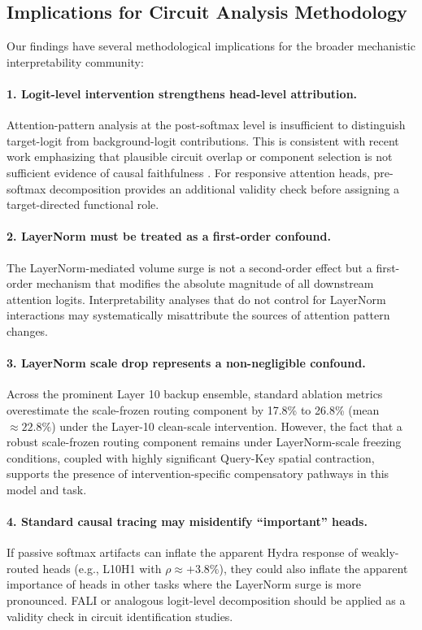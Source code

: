 \documentclass[10pt]{article} %
\begin{document}
\subsection{Implications for Circuit Analysis Methodology}

Our findings have several methodological implications for the broader
mechanistic interpretability community:

\paragraph{1. Logit-level intervention strengthens head-level attribution.}
Attention-pattern analysis at the post-softmax level is insufficient to
distinguish target-logit from background-logit contributions. This is
consistent with recent work emphasizing that plausible circuit overlap or
component selection is not sufficient evidence of causal faithfulness
\citep{hanna2024faithfulness,gupta2024interpbench}. For responsive attention
heads, pre-softmax decomposition provides an additional validity check before
assigning a target-directed functional role.

\paragraph{2. LayerNorm must be treated as a first-order confound.}
The LayerNorm-mediated volume surge is not a second-order effect but a first-order
mechanism that modifies the absolute magnitude of all downstream attention logits.
Interpretability analyses that do not control for LayerNorm interactions
may systematically misattribute the sources of attention pattern changes.

\paragraph{3. LayerNorm scale drop represents a non-negligible confound.}
Across the prominent Layer 10 backup ensemble, standard ablation metrics overestimate the scale-frozen routing component by 17.8\% to 26.8\% (mean $\approx 22.8\%$) under the Layer-10 clean-scale intervention. However, the fact that a robust scale-frozen routing component remains under LayerNorm-scale freezing conditions, coupled with highly significant Query-Key spatial contraction, supports the presence of intervention-specific compensatory pathways in this model and task.

\paragraph{4. Standard causal tracing may misidentify ``important'' heads.}
If passive softmax artifacts can inflate the apparent Hydra response of
weakly-routed heads (e.g., L10H1 with $\rho \approx +3.8\%$), they could also
inflate the apparent importance of heads in other tasks where the LayerNorm
surge is more pronounced. FALI or analogous logit-level decomposition should be
applied as a validity check in circuit identification studies.
\end{document}
